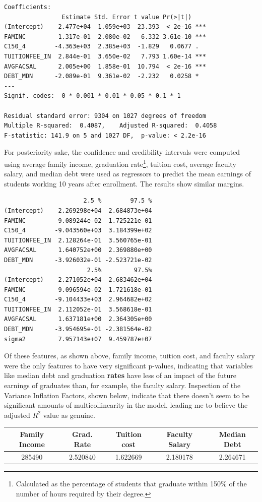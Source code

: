\documentclass[10pt]{article}
\begin{document}
\begin{lstlisting}
Coefficients:
                Estimate Std. Error t value Pr(>|t|)    
(Intercept)    2.477e+04  1.059e+03  23.393  < 2e-16 ***
FAMINC         1.317e-01  2.080e-02   6.332 3.61e-10 ***
C150_4        -4.363e+03  2.385e+03  -1.829   0.0677 .  
TUITIONFEE_IN  2.844e-01  3.650e-02   7.793 1.60e-14 ***
AVGFACSAL      2.005e+00  1.858e-01  10.794  < 2e-16 ***
DEBT_MDN      -2.089e-01  9.361e-02  -2.232   0.0258 *  
---
Signif. codes:  0 * 0.001 * 0.01 * 0.05 * 0.1 * 1

Residual standard error: 9304 on 1027 degrees of freedom
Multiple R-squared:  0.4087,	Adjusted R-squared:  0.4058 
F-statistic: 141.9 on 5 and 1027 DF,  p-value: < 2.2e-16
\end{lstlisting}
For posteriority sake, the confidence and credibility intervals were computed using average family income, graduation rate\footnote{Calculated as the percentage of students that graduate within 150\% of the number of hours required by their degree.}, tuition cost, average faculty salary, and median debt were used as regressors to predict the mean earnings of students working 10 years after enrollment. The results show similar margins. 
\begin{lstlisting}
                      2.5 %        97.5 %
(Intercept)    2.269298e+04  2.684873e+04
FAMINC         9.089244e-02  1.725221e-01
C150_4        -9.043560e+03  3.184399e+02
TUITIONFEE_IN  2.128264e-01  3.560765e-01
AVGFACSAL      1.640752e+00  2.369880e+00
DEBT_MDN      -3.926032e-01 -2.523721e-02
                       2.5%         97.5%
(Intercept)    2.271052e+04  2.683462e+04
FAMINC         9.096594e-02  1.721618e-01
C150_4        -9.104433e+03  2.964682e+02
TUITIONFEE_IN  2.112052e-01  3.568618e-01
AVGFACSAL      1.637181e+00  2.364305e+00
DEBT_MDN      -3.954695e-01 -2.381564e-02
sigma2         7.957143e+07  9.459787e+07
\end{lstlisting}
Of these features, as shown above, family income, tuition cost, and faculty salary were the only features to have very significant p-values, indicating that variables like median debt and graduation {\bf rates} have less of an impact of the future earnings of graduates than, for example, the faculty salary. Inspection of the Variance Inflation Factors, shown below, indicate that there doesn't seem to be significant amounts of multicollinearity in the model, leading me to believe the adjusted $R^2$ value as genuine. 
\begin{center}
 \begin{tabular}{|c c c c c|} 
 \hline
 Family Income & Grad. Rate & Tuition cost & Faculty Salary & Median Debt \\  [0.5ex] 
 \hline
 285490 & 2.520840 & 1.622669 & 2.180178 & 2.264671  \\ 
 \hline 
\end{tabular}
\end{center}
\end{document}
